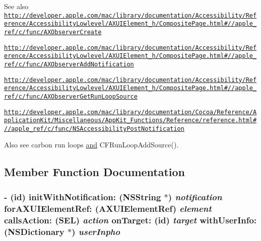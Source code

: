 \begin{DoxySeeAlso}{See also}
\href{http://developer.apple.com/mac/library/documentation/Accessibility/Reference/AccessibilityLowlevel/AXUIElement_h/CompositePage.html#//apple_ref/c/func/AXObserverCreate}{\tt http://developer.apple.com/mac/library/documentation/Accessibility/Reference/AccessibilityLowlevel/AXUIElement\_\-h/CompositePage.html\#//apple\_\-ref/c/func/AXObserverCreate} 

\href{http://developer.apple.com/mac/library/documentation/Accessibility/Reference/AccessibilityLowlevel/AXUIElement_h/CompositePage.html#//apple_ref/c/func/AXObserverAddNotification}{\tt http://developer.apple.com/mac/library/documentation/Accessibility/Reference/AccessibilityLowlevel/AXUIElement\_\-h/CompositePage.html\#//apple\_\-ref/c/func/AXObserverAddNotification} 

\href{http://developer.apple.com/mac/library/documentation/Accessibility/Reference/AccessibilityLowlevel/AXUIElement_h/CompositePage.html#//apple_ref/c/func/AXObserverGetRunLoopSource}{\tt http://developer.apple.com/mac/library/documentation/Accessibility/Reference/AccessibilityLowlevel/AXUIElement\_\-h/CompositePage.html\#//apple\_\-ref/c/func/AXObserverGetRunLoopSource} 

\href{http://developer.apple.com/mac/library/documentation/Cocoa/Reference/ApplicationKit/Miscellaneous/AppKit_Functions/Reference/reference.html#//apple_ref/c/func/NSAccessibilityPostNotification}{\tt http://developer.apple.com/mac/library/documentation/Cocoa/Reference/ApplicationKit/Miscellaneous/AppKit\_\-Functions/Reference/reference.html\#//apple\_\-ref/c/func/NSAccessibilityPostNotification} 

Also see carbon run loops \hyperlink{macros_8h_aa3d7d535cf450b91b9cb6d9cee2edbb9}{and} CFRunLoopAddSource(). 
\end{DoxySeeAlso}


\subsection{Member Function Documentation}
\hypertarget{interface_g_d_accessibility_observer_a38b7e5cbcdd5a9d4ff0e61fef5fede37}{
\subsubsection[{initWithNotification:forAXUIElementRef:callsAction:onTarget:withUserInfo:}]{\setlength{\rightskip}{0pt plus 5cm}-\/ (id) initWithNotification: ({\bf NSString} $\ast$) {\em notification}\/ forAXUIElementRef: (AXUIElementRef) {\em element}\/ callsAction: (SEL) {\em action}\/ onTarget: (id) {\em target}\/ withUserInfo: (NSDictionary $\ast$) {\em userInpho}}}
\label{interface_g_d_accessibility_observer_a38b7e5cbcdd5a9d4ff0e61fef5fede37}


